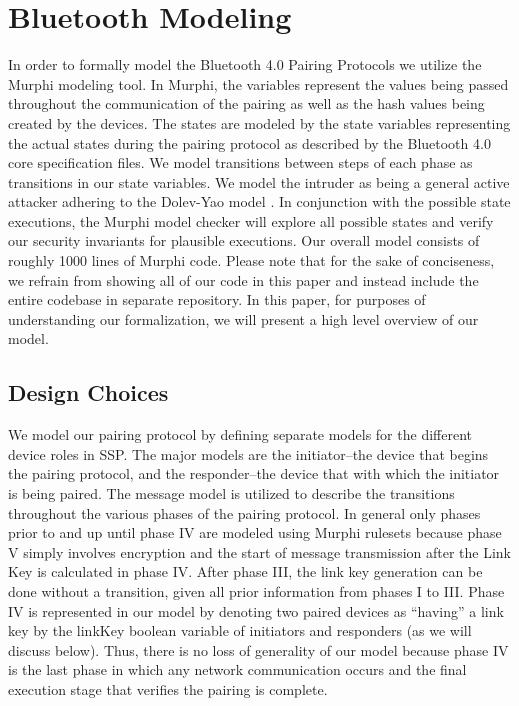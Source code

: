 \documentclass{acm_proc_article-sp}
\begin{document}
\section{Bluetooth Modeling}
In order to formally model the Bluetooth 4.0 Pairing Protocols we utilize the Murphi modeling tool. In Murphi, the variables represent the values being passed throughout the communication of the pairing as well as the hash values being created by the devices. The states are modeled by the state variables representing the actual states during the pairing protocol as described by the Bluetooth 4.0 core specification files. We model transitions between steps of each phase as transitions in our state variables. We model the intruder as being a general active attacker adhering to the Dolev-Yao model \cite{dolev:yao}. In conjunction with the possible state executions, the Murphi model checker will explore all possible states and verify our security invariants for plausible executions. Our overall model consists of roughly 1000 lines of Murphi code. Please note that for the sake of conciseness, we refrain from showing all of our code in this paper and instead include the entire codebase in separate repository. In this paper, for purposes of understanding our formalization, we will present a high level overview of our model.

\subsection{Design Choices}
We model our pairing protocol by defining separate models for the different device roles in SSP. The major models are the initiator--the device that begins the pairing protocol, and the responder--the device that with which the initiator is being paired. The message model is utilized to describe the transitions throughout the various phases of the pairing protocol. In general only phases prior to and up until phase IV are modeled using Murphi rulesets because phase V simply involves encryption and the start of message transmission after the Link Key is calculated in phase IV. After phase III, the link key generation can be done without a transition, given all prior information from phases I to III. Phase IV is represented in our model by denoting two paired devices as ``having'' a link key by the linkKey boolean variable of initiators and responders (as we will discuss below). Thus, there is no loss of generality of our model because phase IV is the last phase in which any network communication occurs and the final execution stage that verifies the pairing is complete.
\end{document}
